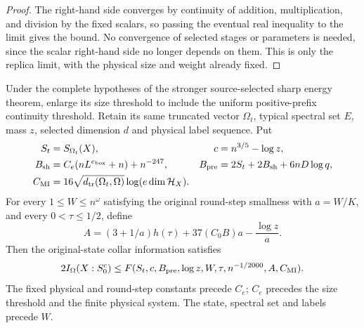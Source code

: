 \begin{proof}
    \leanok
    The right-hand side converges by continuity of addition, multiplication,
    and division by the fixed scalars, so passing the eventual real inequality to
    the limit gives the bound.  No convergence of selected stages or parameters is needed,
    since the scalar right-hand side no longer depends on them.  This is only
    the replica limit, with the physical size and weight already fixed.
\end{proof}

\begin{lemma}
    \label{thm:source-actual-information}
    \leanok
    Under the complete hypotheses of the stronger source-selected sharp
    energy theorem, enlarge its size threshold to include the uniform
    positive-prefix continuity threshold.  Retain its same truncated vector
    $\Omega_t$, typical spectral set $E$, mass $z$, selected dimension $d$ and
    physical label sequence.  Put
    \begin{align*}
        S_t         & =S_{\Omega_t}(X),                     & c & =n^{3/5}-\log z, \\
        B_{\rm sh}  & =C_e(nL^{e_{\rm box}}+n)+n^{-247},    &
        B_{\rm pre} & =2S_t+2B_{\rm sh}+6nD\log q,                                 \\
        C_{\rm MI}  & =16\sqrt{d_{\rm tr}(\Omega_t,\Omega)}
        \log(e\dim\mathcal H_X).
    \end{align*}
    For every $1\leq W\leq n^\omega$ satisfying the original round-step
    smallness with $a=W/K$, and every $0<\tau\leq1/2$, define
    \[
        A=(3+1/a)h(\tau)+37(C_0B)a-\frac{\log z}{a}.
    \]
    Then the original-state collar information satisfies
    \[
        2I_\Omega(X:S_0^c)
        \leq F(S_t,c,B_{\rm pre},\log z,W,\tau,n^{-1/2000},A,C_{\rm MI}).
    \]
    The fixed physical and round-step constants precede $C_e$; $C_e$ precedes
    the size threshold and the finite physical system.  The state, spectral
    set and labels precede $W$.
\end{lemma}

